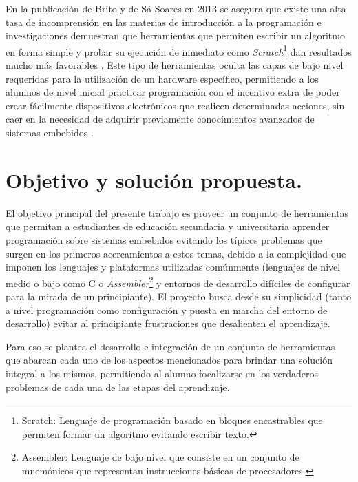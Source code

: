 En la publicación de Brito y de Sá-Soares en 2013 \cite{papereducacion3} se asegura que existe una alta tasa de incomprensión en las materias de introducción a la programación e investigaciones demuestran que herramientas que permiten escribir un algoritmo en forma simple y probar su ejecución de inmediato como \textit{Scratch}\footnote{Scratch: Lenguaje de programación basado en bloques encastrables que permiten formar un algoritmo evitando escribir texto.} dan resultados mucho más favorables \cite{papereducacion4}. Este tipo de herramientas oculta las capas de bajo nivel requeridas para la utilización de un hardware específico, permitiendo a los alumnos de nivel inicial practicar programación con el incentivo extra de poder crear fácilmente dispositivos electrónicos que realicen determinadas acciones, sin caer en la necesidad de adquirir previamente conocimientos avanzados de sistemas embebidos \cite{wikiscratch}.


\section{Objetivo y solución propuesta.}

El objetivo principal del presente trabajo es proveer un conjunto de herramientas que permitan a estudiantes de educación secundaria y universitaria aprender programación sobre sistemas embebidos evitando los típicos problemas que surgen en los primeros acercamientos a estos temas, debido a la complejidad que imponen los lenguajes y plataformas utilizadas comúnmente (lenguajes de nivel medio o bajo como C o \textit{Assembler}\footnote{Assembler: Lenguaje de bajo nivel que consiste en un conjunto de mnemónicos que representan instrucciones básicas de procesadores. } y entornos de desarrollo difíciles de configurar para la mirada de un principiante).
El proyecto busca desde su simplicidad (tanto a nivel programación como configuración y puesta en marcha del entorno de desarrollo) evitar al principiante frustraciones que desalienten el aprendizaje.

Para eso se plantea el desarrollo e integración de un conjunto de herramientas que abarcan cada uno de los aspectos mencionados para brindar una solución integral a los mismos, permitiendo al alumno focalizarse en los verdaderos problemas de cada una de las etapas del aprendizaje.
 
